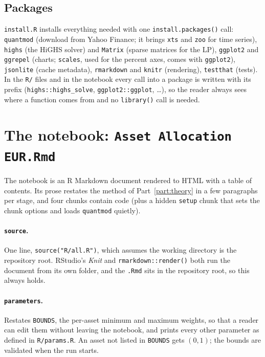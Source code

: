 \documentclass[11pt,a4paper]{article}
\newcommand{\code}[1]{\texttt{#1}}
\newcommand{\file}[1]{\texttt{#1}}
\theoremstyle{plain}
\theoremstyle{remark}
\begin{document}
\subsection{Packages}

\file{install.R} installs everything needed with one
\code{install.packages()} call: \code{quantmod} (download from Yahoo
Finance; it brings \code{xts} and \code{zoo} for time series),
\code{highs} (the HiGHS solver) and \code{Matrix} (sparse matrices for the
LP), \code{ggplot2} and \code{ggrepel} (charts; \code{scales}, used for the
percent axes, comes with \code{ggplot2}), \code{jsonlite} (cache metadata),
\code{rmarkdown} and \code{knitr} (rendering), \code{testthat} (tests). In
the \file{R/} files and in the notebook every call into a package is written
with its prefix (\code{highs::highs\_solve}, \code{ggplot2::ggplot}, \dots), so
the reader always sees where a function comes from and no \code{library()}
call is needed.

\section{The notebook: \file{Asset Allocation EUR.Rmd}}
\label{sec:code-notebook}

The notebook is an R Markdown document rendered to HTML with a table of
contents. Its prose restates the method of Part~\ref{part:theory} in a few
paragraphs per stage, and four chunks contain code (plus a hidden
\code{setup} chunk that sets the chunk options and loads \code{quantmod}
quietly).

\paragraph{\code{source}.} One line, \code{source("R/all.R")}, which assumes
the working directory is the repository root. RStudio's \emph{Knit} and
\code{rmarkdown::render()} both run the document from its own folder, and
the \file{.Rmd} sits in the repository root, so this always holds.

\paragraph{\code{parameters}.} Restates \code{BOUNDS}, the per-asset minimum
and maximum weights, so that a reader can edit them without leaving the
notebook, and prints every other parameter as defined in \file{R/params.R}.
An asset not listed in \code{BOUNDS} gets $(0,1)$; the bounds are validated
when the run starts.
\end{document}

